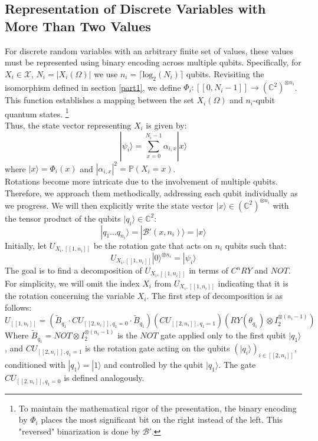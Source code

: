 \subsection{Representation of Discrete Variables with More Than Two Values}
\label{QBNgeneral}
For discrete random variables with an arbitrary finite set of values, these values must be represented using binary encoding across multiple qubits. Specifically, for $X_i \in \mathcal{X}$, $N_i = |X_i(\Omega)|$ we use $n_i = \lceil \mathrm{log}_2(N_i) \rceil$ qubits. Revisiting the isomorphism defined in section \ref{part1}, we define $\Phi_i:[\![0,N_i-1]\!] \rightarrow (\mathbb{C}^2)^{\otimes n_i}$. 
This function establishes a mapping between the set $X_i(\Omega)$ and  $n_i$-qubit quantum states.
\footnote{To maintain the mathematical rigor of the presentation, the binary encoding by $\Phi_i$ places the most significant bit on the right instead of the left. This "reversed" binarization is done by $\mathscr{B}'$. }
\\[5pt]
Thus, the state vector representing $X_i$ is given by:
\[|\psi_i\rangle = \sum_{x=0}^{N_i-1}\alpha_{i,x}|x\rangle\]
where $|x\rangle = \Phi_i(x)$ and $|\alpha_{i,x}|^2 = \mathbb{P}(X_i=x)$. 
\\[5pt]
Rotations become more intricate due to the involvement of multiple qubits. Therefore, we approach them methodically, addressing each qubit individually as we progress.
We will then explicitly write the state vector $|x\rangle \in (\mathbb{C}^2)^{\otimes n_i}$ with the tensor product of the qubits $|q_i\rangle \in \mathbb{C}^2$:
\[|q_1 \hdots q_{n_i}\rangle = |\mathscr{B}'(x,n_i)\rangle = |x\rangle \]
Initially, let $U_{X_i, [\![1,n_i]\!]}$ be the rotation gate that acts on $n_i$ qubits such that:
\[U_{X_i, [\![1,n_i]\!]}|0\rangle^{\otimes n_i} = |\psi_i\rangle\]
The goal is to find a decomposition of $U_{X_i, [\![1,n_i]\!]}$ in terms of $C^nRY$ and $NOT$. 
\\[5pt]
For simplicity, we will omit the index $X_i$ from $U_{X_i, [\![1,n_i]\!]}$ indicating that it is the rotation concerning the variable $X_i$. The first step of decomposition is as follows:
\[U_{[\![1,n_i]\!]} = (\tilde{B}_{q_1} \cdot CU_{[\![2,n_i]\!],q_1=0} \cdot \tilde{B}_{q_1})(CU_{[\![2,n_i]\!],q_1=1})(RY(\theta_{q_1})\otimes I_2^{\otimes (n_i-1)})\]
Where $\tilde{B}_{q_1} = NOT \otimes I_2^{\otimes (n_i-1)}$ is the $NOT$ gate applied only to the first qubit $|q_1\rangle$, and $CU_{[\![2,n_i]\!],q_1=1}$ is the rotation gate acting on the qubits $(|q_i\rangle)_{i\in[\![2,n_i]\!]}$, conditioned with $|q_1\rangle=|1\rangle$ and controlled by the qubit $|q_1\rangle$. The gate $CU_{[\![2,n_i]\!],q_1=0}$ is defined analogously. 
